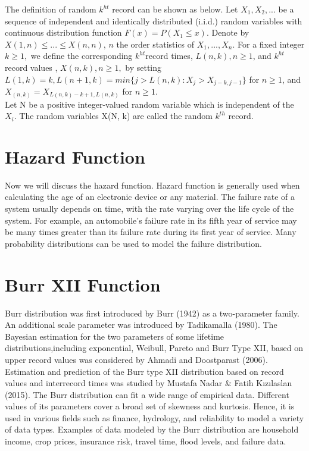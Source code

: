 \documentclass[a4paper, 11pt]{article}
\numberwithin{equation}{section}
\begin{document}
The definition of random  $ k^{ht}$  record  can  be  shown  as  below. 
Let $ X_1, X_2, . . . $ be a sequence of independent and identically distributed (i.i.d.) random variables with continuous distribution function  $ F(x) = P (X_1 \leq x)$. Denote by  $X{(1,n)} \leq . . . \leq X{(n,n)}$, $n$ the order statistics of  $ X_1, . . . , X_n.$ For a fixed integer  $k \geq 1,$ we define the corresponding  $k^{ht}$record times, ${L(n, k), n \geq 1}$, and  $k^{ht} $ record values ,  
${X{(n, k)}, n \geq 1},$ by setting
$  L(1, k) = k,	L(n + 1, k) = min\{j > L(n, k) : X_{j} > X_{j-k,j-1}\}$ for $n \geq 1 $, and
$ X_{(n, k)} = X_{L(n,k)−k+1,L(n,k)} $	for	  $n \geq 1.$\\
Let N be a positive integer-valued random variable which is independent of the $ X_{i}. $ The random variables X(N, k) are called the random $k^{th} $ record.

\section{Hazard Function}

Now we will discuss the hazard function. Hazard function is generally used when calculating the age of an electronic device or any material. The failure rate of a system usually depends on time, with the rate varying over the life cycle of the system. For example, an automobile's failure rate in its fifth year of service may be many times greater than its failure rate during its first year of service.
Many probability distributions can be used to model the failure distribution.

\section{Burr XII Function}

Burr distribution was first introduced by Burr (1942) as a two-parameter family. An additional scale parameter was introduced by Tadikamalla (1980). The Bayesian estimation for the two parameters of some lifetime distributions,including exponential, Weibull, Pareto and Burr Type XII, based on upper record values was considered by Ahmadi and Doostparast (2006). Estimation and prediction of the Burr type XII distribution based on record values and interrecord times was studied by Mustafa Nadar & Fatih Kızılaslan (2015). The Burr distribution can fit a wide range of empirical data. Different values of its parameters cover a broad set of skewness and kurtosis. Hence, it is used in various fields such as finance, hydrology, and reliability to model a variety of data types. Examples of data modeled by the Burr distribution are household income, crop prices, insurance risk, travel time, flood levels, and failure data.
\end{document}
